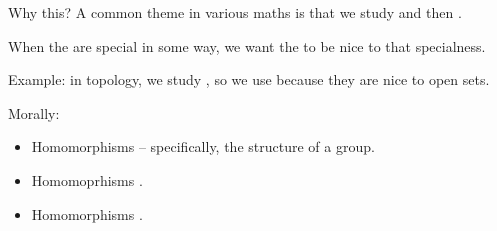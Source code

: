 \documentclass[8pt, handout]{beamer}
\begin{document}
\begin{frame}{Why this?}
  A common theme in various maths is that we study  and then .

  \medskip \pause

  When the  are special in some way, we want the  to be nice to that specialness.

  \medskip \pause

  Example: in topology, we study , so we use  because they are nice to open sets.

  \medskip \pause
  \begin{exampleblock}{Morally:} \pause
    \begin{itemize}
      \item Homomorphisms  -- specifically, the structure of a group. \pause
      \item Homomoprhisms . \pause
      \item Homomorphisms . \pause
    \end{itemize}
  \end{exampleblock}
\end{frame}

\end{document}
